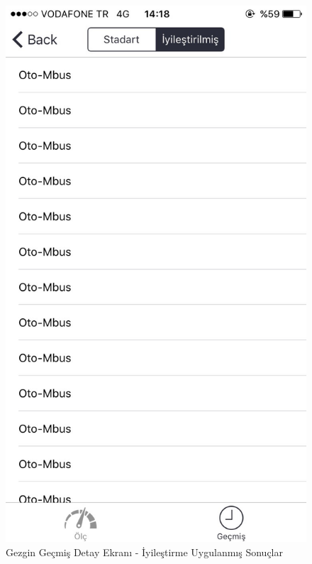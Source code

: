 \begin{figure}[!htbp]
\centering
\includegraphics[scale=0.2]{projectChapters/images/IMG_0368.jpg}
\caption{Gezgin Geçmiş Detay Ekranı - İyileştirme Uygulanmış Sonuçlar}
\end{figure}

